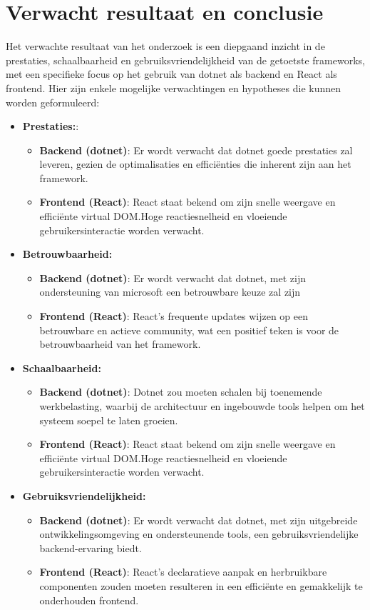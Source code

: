 \documentclass{hogent-article}
\begin{document}
\section{Verwacht resultaat en conclusie}%
\label{sec:verwachte_resultaten}
Het verwachte resultaat van het onderzoek is een diepgaand inzicht in de prestaties, schaalbaarheid en gebruiksvriendelijkheid van de getoetste frameworks, met een specifieke focus op het gebruik van dotnet als backend en React als frontend. Hier zijn enkele mogelijke verwachtingen en hypotheses die kunnen worden geformuleerd:

\begin{itemize}
  \item \textbf{Prestaties:}:
    \begin{itemize}
      \item \textbf{Backend (dotnet)}: Er wordt verwacht dat dotnet goede prestaties zal leveren, gezien de optimalisaties en efficiënties die inherent zijn aan het framework.
      \item \textbf{Frontend (React)}: React staat bekend om zijn snelle weergave en efficiënte virtual DOM.Hoge reactiesnelheid en vloeiende gebruikersinteractie worden verwacht.
    \end{itemize}
  \item \textbf{Betrouwbaarheid:}
    \begin{itemize}
      \item \textbf{Backend (dotnet)}: Er wordt verwacht dat dotnet, met zijn ondersteuning van microsoft een betrouwbare keuze zal zijn
      \item \textbf{Frontend (React)}: React's frequente updates wijzen op een betrouwbare en actieve community, wat een positief teken is voor de betrouwbaarheid van het framework.
    \end{itemize}
  \item \textbf{Schaalbaarheid:}
    \begin{itemize}
      \item \textbf{Backend (dotnet)}: Dotnet zou moeten schalen bij toenemende werkbelasting, waarbij de architectuur en ingebouwde tools helpen om het systeem soepel te laten groeien.
      \item \textbf{Frontend (React)}: React staat bekend om zijn snelle weergave en efficiënte virtual DOM.Hoge reactiesnelheid en vloeiende gebruikersinteractie worden verwacht.
    \end{itemize}
  \item \textbf{Gebruiksvriendelijkheid:}
    \begin{itemize}
      \item \textbf{Backend (dotnet)}: Er wordt verwacht dat dotnet, met zijn uitgebreide ontwikkelingsomgeving en ondersteunende tools, een gebruiksvriendelijke backend-ervaring biedt.
      \item \textbf{Frontend (React)}: React's declaratieve aanpak en herbruikbare componenten zouden moeten resulteren in een efficiënte en gemakkelijk te onderhouden frontend.
    \end{itemize}
\end{itemize}
\end{document}
